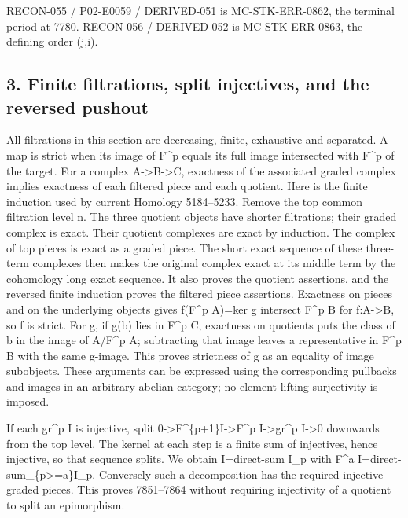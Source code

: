 \documentclass[11pt]{article}
\begin{document}
RECON-055 /\allowbreak{} P02-E0059 /\allowbreak{} DERIVED-051 is MC-STK-ERR-0862,\allowbreak{} the terminal period at 7780. RECON-056 /\allowbreak{} DERIVED-052 is MC-STK-ERR-0863,\allowbreak{} the defining order (j,\allowbreak{}i)\allowbreak{}.

\subsection{\texorpdfstring{3. Finite filtrations,\allowbreak{} split injectives,\allowbreak{} and the reversed pushout}{3. Finite  split  and the reversed pushout}}\label{proofs-7589-8350-finite-filtrations-split-injectives-and-the-reversed-pushout}

All filtrations in this section are decreasing,\allowbreak{} finite,\allowbreak{} exhaustive and separated. A map is strict when its image of F\^{}p equals its full image intersected with F\^{}p of the target. For a complex A\allowbreak{}->B\allowbreak{}->C,\allowbreak{} exactness of the associated graded complex implies exactness of each filtered piece and each quotient. Here is the finite induction used by current Homology 5184–\allowbreak{}5233. Remove the top common filtration level n. The three quotient objects have shorter filtrations; their graded complex is exact. Their quotient complexes are exact by induction. The complex of top pieces is exact as a graded piece. The short exact sequence of these three-term complexes then makes the original complex exact at its middle term by the cohomology long exact sequence. It also proves the quotient assertions,\allowbreak{} and the reversed finite induction proves the filtered piece assertions. Exactness on pieces and on the underlying objects gives f(F\^{}p A)\allowbreak{}\allowbreak{}=ker g intersect F\^{}p B for f:\allowbreak{}A\allowbreak{}->B,\allowbreak{} so f is strict. For g,\allowbreak{} if g(b)\allowbreak{} lies in F\^{}p C,\allowbreak{} exactness on quotients puts the class of b in the image of A/\allowbreak{}F\textasciicircum{}p A; subtracting that image leaves a representative in F\^{}p B with the same g-image. This proves strictness of g as an equality of image subobjects. These arguments can be expressed using the corresponding pullbacks and images in an arbitrary abelian category; no element-lifting surjectivity is imposed.

If each gr\^{}p I is injective,\allowbreak{} split 0\allowbreak{}->F\textasciicircum{}\{p\allowbreak{}+1\}I\allowbreak{}->F\textasciicircum{}p I\allowbreak{}->gr\textasciicircum{}p I\allowbreak{}->0 downwards from the top level. The kernel at each step is a finite sum of injectives,\allowbreak{} hence injective,\allowbreak{} so that sequence splits. We obtain I\allowbreak{}=direct-sum I\_\allowbreak{}p with F\^{}a I\allowbreak{}=direct-sum\_\allowbreak{}\{p>\allowbreak{}=a\}I\_\allowbreak{}p. Conversely such a decomposition has the required injective graded pieces. This proves 7851–\allowbreak{}7864 without requiring injectivity of a quotient to split an epimorphism.
\end{document}
